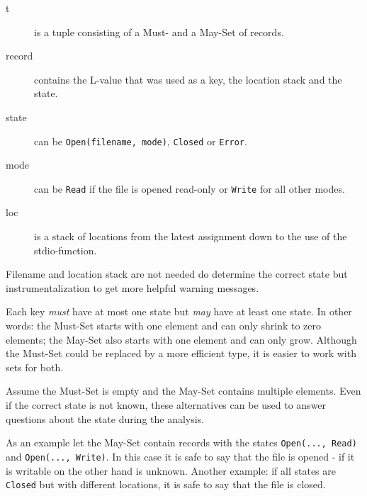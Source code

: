 
\begin{description}
\item[t] is a tuple consisting of a Must- and a May-Set of records.

\item[record] contains the L-value that was used as a key, the location stack and the state.

\item[state] can be \verb|Open(filename, mode)|, \verb|Closed| or \verb|Error|.

\item[mode] can be \verb|Read| if the file is opened read-only or \verb|Write| for all other modes.

\item[loc] is a stack of locations from the latest assignment down to the use of the stdio-function.
\end{description}
Filename and location stack are not needed do determine the correct state but instrumentalization to get more helpful warning messages.

Each key \textit{must} have at most one state but \textit{may} have at least one state.
In other words: the Must-Set starts with one element and can only shrink to zero elements; the May-Set also starts with one element and can only grow.
Although the Must-Set could be replaced by a more efficient type, it is easier to work with sets for both.

Assume the Must-Set is empty and the May-Set contains multiple elements. Even if the correct state is not known, these alternatives can be used to answer questions about the state during the analysis.

As an example let the May-Set contain records with the states \verb|Open(..., Read)| and \verb|Open(..., Write)|. In this case it is safe to say that the file is opened - if it is writable on the other hand is unknown. Another example: if all states are \verb|Closed| but with different locations, it is safe to say that the file is closed. %

